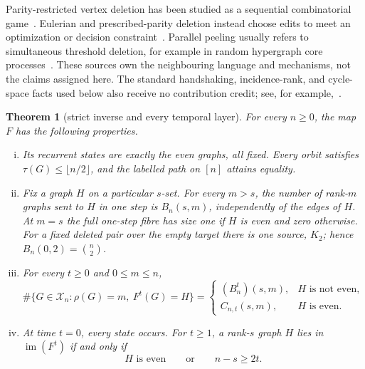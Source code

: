 \documentclass[a4paper,10pt]{amsart}
\newtheorem{theorem}{Theorem}
\theoremstyle{remark}
\newcommand{\X}{\mathcal X}
\newcommand{\rank}{\rho}
\begin{document}
Parity-restricted vertex deletion has been studied as a sequential
combinatorial game~\cite{NowakowskiOttaway2005,Kruger2014}.  Eulerian and
prescribed-parity deletion instead choose edits to meet an optimization or
decision constraint~\cite{CyganEtAl2014,DabrowskiEtAl2016}.  Parallel peeling
usually refers to simultaneous threshold deletion, for example in random
hypergraph core processes~\cite{JiangMitzenmacherThaler2014}.  These sources
own the neighbouring language and mechanisms, not the claims assigned here.
The standard handshaking, incidence-rank, and cycle-space facts used below
also receive no contribution credit; see, for example,~\cite{Diestel2017}.

\begin{theorem}[strict inverse and every temporal layer]\label{thm:main}
For every $n\geq0$, the map $F$ has the following properties.
\begin{enumerate}[(i)]
\item Its recurrent states are exactly the even graphs, all fixed.  Every
orbit satisfies $\tau(G)\leq\lfloor n/2\rfloor$, and the labelled path on
$[n]$ attains equality.

\item Fix a graph $H$ on a particular $s$-set.  For every $m>s$, the number
of rank-$m$ graphs sent to $H$ in one step is $B_n(s,m)$, independently of
the edges of $H$.  At $m=s$ the full one-step fibre has size one if $H$ is
even and zero otherwise.  For a fixed deleted pair over the empty target
there is one source, $K_2$; hence $B_n(0,2)=\binom n2$.

\item For every $t\geq0$ and $0\leq m\leq n$,
\begin{equation}\label{eq:iterate-fibre}
 \#\{G\in\X_n:\rank(G)=m,\ F^t(G)=H\}
 =\begin{cases}
 (B_n^t)(s,m),&H\text{ is not even},\\
 C_{n,t}(s,m),&H\text{ is even}.
 \end{cases}
\end{equation}

\item At time $t=0$, every state occurs.  For $t\geq1$, a rank-$s$ graph
$H$ lies in $\operatorname{im}(F^t)$ if and only if
\begin{equation}\label{eq:image}
 H\text{ is even}\qquad\text{or}\qquad n-s\geq2t.
\end{equation}


\end{enumerate}
\end{theorem}
\end{document}
